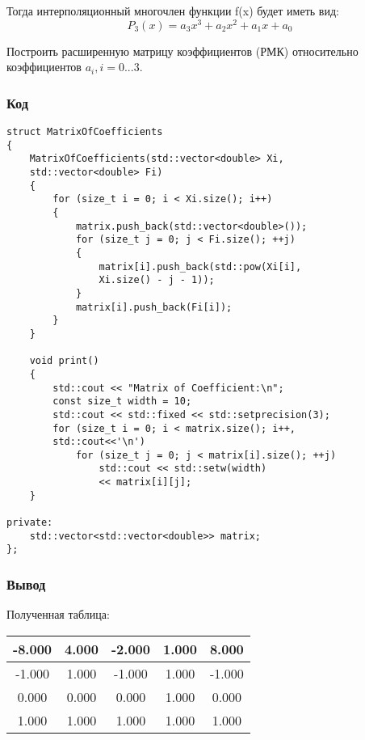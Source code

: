 \documentclass[bachelor, och, pract]{SCWorks}
\begin{document}
Тогда интерполяционный многочлен функции f(x) будет иметь вид:
$$P_3(x) = a_3x^3 + a_2x^2 + a_1x + a_0$$

Построить расширенную матрицу коэффициентов (РМК) относительно коэффициентов $a_i, i = 0...3$.

\subsubsection{Код}

\begin{lstlisting}
struct MatrixOfCoefficients
{
    MatrixOfCoefficients(std::vector<double> Xi, 
    std::vector<double> Fi)
    {
        for (size_t i = 0; i < Xi.size(); i++)
        {
            matrix.push_back(std::vector<double>());
            for (size_t j = 0; j < Fi.size(); ++j)
            {
                matrix[i].push_back(std::pow(Xi[i], 
                Xi.size() - j - 1));
            }
            matrix[i].push_back(Fi[i]);
        }
    }

    void print()
    {
        std::cout << "Matrix of Coefficient:\n";
        const size_t width = 10;
        std::cout << std::fixed << std::setprecision(3);
        for (size_t i = 0; i < matrix.size(); i++, 
        std::cout<<'\n')
            for (size_t j = 0; j < matrix[i].size(); ++j)
                std::cout << std::setw(width) 
                << matrix[i][j];
    }

private:
    std::vector<std::vector<double>> matrix;
};
\end{lstlisting}

\subsubsection{Вывод}

Полученная таблица:

\begin{table}[h]
    \centering
    \begin{tabular}{|c|c|c|c|c|}
\hline -8.000  &   4.000  &  -2.000  &   1.000  &  8.000\\\hline
    -1.000  &   1.000  &  -1.000  &   1.000  &  -1.000\\\hline
     0.000  &   0.000  &   0.000  &   1.000  &   0.000\\\hline
     1.000  &   1.000  &   1.000  &   1.000  &   1.000\\\hline
    \end{tabular}
\end{table}
\end{document}
